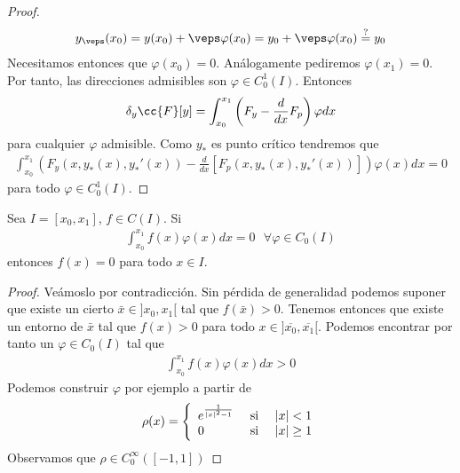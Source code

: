 \begin{teo}
\begin{proof}
        \begin{gather*}
            y_\veps(x_0) = y(x_0) + \veps \varphi(x_0) = y_0 + \veps \varphi(x_0) \overset{?}{=} y_0
        \end{gather*}
        Necesitamos entonces que $\varphi(x_0)=0$. Análogamente pediremos $\varphi(x_1) = 0$. Por tanto, las direcciones admisibles son $\varphi \in C_0^1(I)$. Entonces 
        \begin{gather*}
            \delta_y \cc{F}[y] = \int_{x_0}^{x_1} \left(F_y - \frac{d}{dx} F_p\right)\varphi dx
        \end{gather*}
        para cualquier $\varphi$ admisible. Como $y_*$ es punto crítico tendremos que
        \begin{gather*}
            \int_{x_0}^{x_1} \left(F_y(x, y_*(x), y_*'(x)) - \frac{d}{dx} [F_p(x, y_*(x), y_*'(x))] \right)\varphi(x) dx = 0
        \end{gather*}
        para todo $\varphi\in C_0^1(I)$.
    \end{proof}
\end{teo}

\begin{lema}
    Sea $I=[x_0, x_1]$, $f\in C(I)$. Si
    \begin{gather*}
        \int_{x_0}^{x_1} f(x) \varphi(x) dx = 0 \ \ \ \forall \varphi \in C_0(I)
    \end{gather*}
    entonces $f(x) = 0$ para todo $x \in I$.
    \begin{proof}
        Veámoslo por contradicción. Sin pérdida de generalidad podemos suponer que existe un cierto $\bar{x}\in ]x_0, x_1[$ tal que $f(\bar{x}) > 0$. Tenemos entonces que existe un entorno de $\bar{x}$ tal que $f(x)>0$ para todo $x\in ]\overline{x_0}, \overline{x_1}[$. Podemos encontrar por tanto un $\varphi\in C_0(I)$ tal que
        \begin{gather*}
            \int_{x_0}^{x_1} f(x) \varphi(x) dx >0
        \end{gather*}
        Podemos construir $\varphi$ por ejemplo a partir de 
        \begin{gather*}
            \rho(x) = \left\{
                \begin{array}{l c l}
                    e^{\frac{1}{|x|^2 - 1}} & \text{ si } & |x| < 1\\
                    0 & \text{ si } & |x| \geq 1
                \end{array}
            \right.
        \end{gather*}
        Observamos que $\rho \in C_0^\infty([-1,1])$
    \end{proof}
\end{lema}

